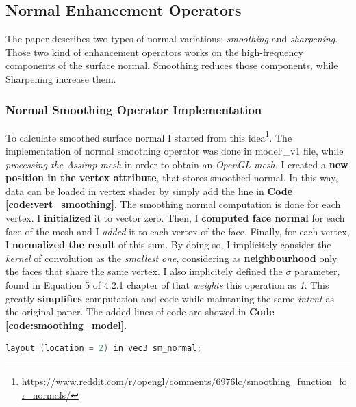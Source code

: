 \subsection{Normal Enhancement Operators}
The paper \cite{referencePaper} describes two types of normal variations: \textit{smoothing} and \textit{sharpening}. Those two kind of enhancement operators works on the high-frequency components of the surface normal. Smoothing reduces those components, while Sharpening increase them. 
\subsubsection{Normal Smoothing Operator Implementation}
To calculate smoothed surface normal I started from this idea\footnote{\url{https://www.reddit.com/r/opengl/comments/6976lc/smoothing_function_for_normals/}}. The implementation of normal smoothing operator was done in model\char`_v1 file, while \textit{processing the Assimp mesh} in order to obtain an \textit{OpenGL mesh}. I created a \textbf{new position in the vertex attribute}, that stores smoothed normal. \newline
In this way, data can be loaded in vertex shader by simply add the line in \textbf{Code \ref{code:vert_smoothing}}. \newline
The smoothing normal computation is done for each vertex. I \textbf{initialized} it to vector zero. Then, I \textbf{computed face normal} for each face of the mesh and I \textit{added} it to each vertex of the face. Finally, for each vertex, I \textbf{normalized the result} of this sum. \newline
By doing so, I implicitely consider the \textit{kernel} of convolution as the \textit{smallest one}, considering as \textbf{neighbourhood} only the faces that share the same vertex. I also implicitely defined the \textit{$\sigma$} parameter, found in Equation 5 of 4.2.1 chapter of \cite{referencePaper} that \textit{weights} this operation as \textit{1}. This greatly \textbf{simplifies} computation and code while maintaning the same \textit{intent} as the original paper. The added lines of code are showed in \textbf{Code \ref{code:smoothing_model}}.
\begin{lstlisting}[language=C++, caption=Smoothed normal loaded in vertex shader,label={code:vert_smoothing}]
layout (location = 2) in vec3 sm_normal;	
\end{lstlisting}
